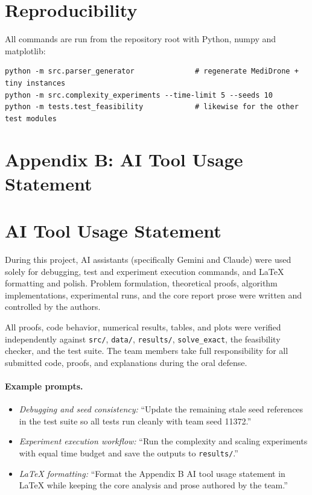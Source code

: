 \documentclass[11pt,a4paper]{article}
\theoremstyle{definition}
\theoremstyle{remark}
\begin{document}
\appendix
\section{Reproducibility}
All commands are run from the repository root with Python, numpy and matplotlib:
\begin{verbatim}
python -m src.parser_generator              # regenerate MediDrone + tiny instances
python -m src.complexity_experiments --time-limit 5 --seeds 10
python -m tests.test_feasibility            # likewise for the other test modules
\end{verbatim}

\section*{Appendix B: AI Tool Usage Statement}
\section{AI Tool Usage Statement}

During this project, AI assistants (specifically Gemini and Claude) were used
solely for debugging, test and experiment execution commands, and LaTeX
formatting and polish. Problem formulation, theoretical proofs, algorithm
implementations, experimental runs, and the core report prose were written and
controlled by the authors.

All proofs, code behavior, numerical results, tables, and plots were verified
independently against \texttt{src/}, \texttt{data/}, \texttt{results/},
\texttt{solve\_exact}, the feasibility checker, and the test suite. The team
members take full responsibility for all submitted code,
proofs, and explanations during the oral defense.

\paragraph{Example prompts.}
\begin{itemize}
\item \emph{Debugging and seed consistency:} ``Update the remaining stale seed
  references in the test suite so all tests run cleanly with team seed 11372.''
\item \emph{Experiment execution workflow:} ``Run the complexity and scaling
  experiments with equal time budget and save the outputs to \texttt{results/}.''
\item \emph{LaTeX formatting:} ``Format the Appendix B AI tool usage statement
  in \LaTeX{} while keeping the core analysis and prose authored by the team.''
\end{itemize}
\end{document}
